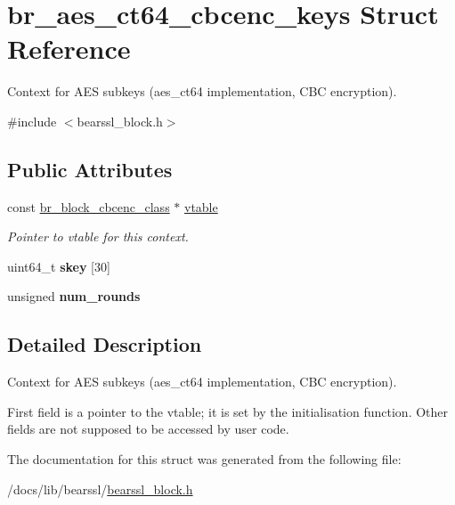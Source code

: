 \hypertarget{structbr__aes__ct64__cbcenc__keys}{}\section{br\+\_\+aes\+\_\+ct64\+\_\+cbcenc\+\_\+keys Struct Reference}
\label{structbr__aes__ct64__cbcenc__keys}


Context for A\+ES subkeys ({\ttfamily aes\+\_\+ct64} implementation, C\+BC encryption).  




{\ttfamily \#include $<$bearssl\+\_\+block.\+h$>$}

\subsection*{Public Attributes}
\begin{DoxyCompactItemize}
\item 
\mbox{\label{structbr__aes__ct64__cbcenc__keys_a609be492289baafbf2f9d1f1c1a4a3cf}} 
const \hyperlink{bearssl__block_8h_ad0ecff523e21a74dc1143dcfa52aa251}{br\+\_\+block\+\_\+cbcenc\+\_\+class} $\ast$ \hyperlink{structbr__aes__ct64__cbcenc__keys_a609be492289baafbf2f9d1f1c1a4a3cf}{vtable}
\begin{DoxyCompactList}\small\item\em Pointer to vtable for this context. \end{DoxyCompactList}\item 
\mbox{\label{structbr__aes__ct64__cbcenc__keys_ac948cfa6c682d9a44ec5f686f6888579}} 
uint64\+\_\+t {\bfseries skey} \mbox{[}30\mbox{]}
\item 
\mbox{\label{structbr__aes__ct64__cbcenc__keys_a848e045769a498704a600d82ef7a6ee9}} 
unsigned {\bfseries num\+\_\+rounds}
\end{DoxyCompactItemize}


\subsection{Detailed Description}
Context for A\+ES subkeys ({\ttfamily aes\+\_\+ct64} implementation, C\+BC encryption). 

First field is a pointer to the vtable; it is set by the initialisation function. Other fields are not supposed to be accessed by user code. 

The documentation for this struct was generated from the following file\+:\begin{DoxyCompactItemize}
\item 
/docs/lib/bearssl/\hyperlink{bearssl__block_8h}{bearssl\+\_\+block.\+h}\end{DoxyCompactItemize}
